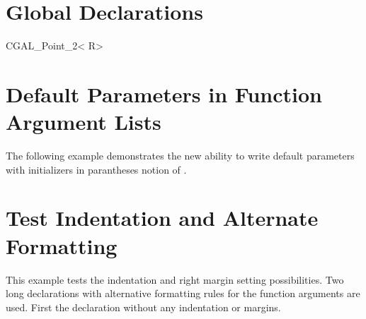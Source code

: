 \documentclass[12pt]{article}
\begin{document}
{\ccSetTwoOfThreeColumns{3.5cm}{3.5cm}








\section{Global Declarations}





\begin{ccClassTemplate}{CGAL_Point_2< R>}
\section{Default Parameters in Function Argument Lists}

The following example demonstrates the new ability to write default
parameters with initializers in parantheses notion of \CC.

\end{ccClassTemplate}



\section{Test Indentation and Alternate Formatting}

This example tests the indentation and right margin setting
possibilities. Two long declarations with alternative formatting rules
for the function arguments are used. First the  declaration without
any indentation or margins.

}
\end{document}
